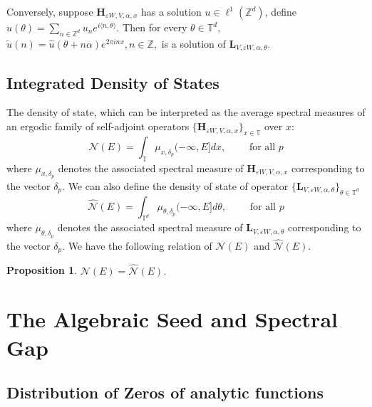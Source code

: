 \documentclass[reqno,11pt]{amsart}
\newtheorem{proposition}{Proposition}[section]
\newcommand{\T}{{\mathbb T}}
\begin{document}
Conversely, suppose $ \mathbf{H}_{\varepsilon W,V,\alpha,x} $ has a solution $ u \in \ell^1(\mathbb{Z}^d) $, define $ \hat{u}(\theta) = \sum_{n\in\mathbb{Z}^d} u_n e^{i\langle n, \theta\rangle} $. Then for every $ \theta\in\mathbb{T}^d $,
$\tilde{u}(n) = \hat{u}(\theta + n\alpha) e^{2\pi i n x},  n\in\mathbb{Z},
$
is a solution of $ \mathbf{L}_{V,\varepsilon W,\alpha,\theta} $. 

\subsection{Integrated Density of States}\label{def:IDS}
The density of state, which can be interpreted as the average spectral measures of an ergodic family of self-adjoint operators $ \{ \mathbf{H}_{\varepsilon W,V,\alpha,x}\}_{x\in\T}  $ over $ x$:
\begin{equation}\label{sids}
    \mathcal{N}(E) = \int_{\mathbb{T}} \mu_{x,\delta_p}(-\infty, E] dx,\qquad \text{ for all } p
\end{equation}
where $ \mu_{x,\delta_p} $ denotes the associated spectral measure of $ \mathbf{H}_{\varepsilon W,V,\alpha,x} $ corresponding to the vector $\delta_p$.
We can also define the density of state of operator $ \{ \mathbf{L}_{V,\varepsilon W,\alpha,\theta} \}_{\theta \in \mathbb{T}^d}$
$$\widehat{\mathcal{N}}(E) =\int_{ \mathbb{T}^d} \mu_{\theta,\delta_p}(-\infty, E] d\theta,\qquad \text{ for all } p$$
where $ \mu_{\theta,\delta_p} $ denotes the associated spectral measure of $  \mathbf{L}_{V,\varepsilon W,\alpha,\theta} $ corresponding to the vector $\delta_p$.
We have the following relation of $ \mathcal{N}(E)$ and $\widehat{\mathcal{N}}(E) $.

\begin{proposition}\label{IDSeq}\cite{GJLS,Puig1}
    $ \mathcal{N}(E)=\widehat{\mathcal{N}}(E) $.
\end{proposition}





\section{The Algebraic Seed and Spectral Gap}
\label{sec:algebraic-seed}

\subsection{Distribution of Zeros of analytic functions}
\end{document}
